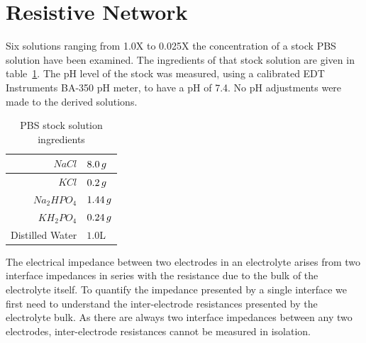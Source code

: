 \documentclass[journal, a4paper]{IEEEtran}
\begin{document}
\section{Resistive Network}
Six solutions ranging from 1.0X to 0.025X the concentration of a stock PBS solution have been examined.
The ingredients of that stock solution are given in table~\ref{tab:PBSrecipe}.
{
    \color{blue}
    The pH level of the stock was measured, using a calibrated EDT Instruments BA-350 pH meter, to have a pH of 7.4. No pH adjustments were made to the derived solutions.
}
\begin{table}
    \begin{center}
        \begin{tabular}{|r|l|}
            \hline
            $NaCl$ & $8.0\thinspace g$ \\ \hline
            $KCl$ & $0.2\thinspace g$ \\ \hline
            $Na_{2}HPO_{4}$ & $1.44\thinspace g$ \\ \hline
            $KH_{2}PO_{4}$ & $0.24\thinspace g$ \\ \hline
            Distilled Water & $1.0$\thinspace L \\ \hline
        \end{tabular}
    \end{center}
    \caption{PBS stock solution ingredients}
    \label{tab:PBSrecipe}
\end{table}

The electrical impedance between two electrodes in an electrolyte arises from two interface impedances in series with the resistance due to the bulk of the electrolyte itself. To quantify the impedance presented by a single interface we first need to understand the inter-electrode resistances presented by the electrolyte bulk. As there are always two interface impedances between any two electrodes, inter-electrode resistances cannot be measured in isolation.
\end{document}
